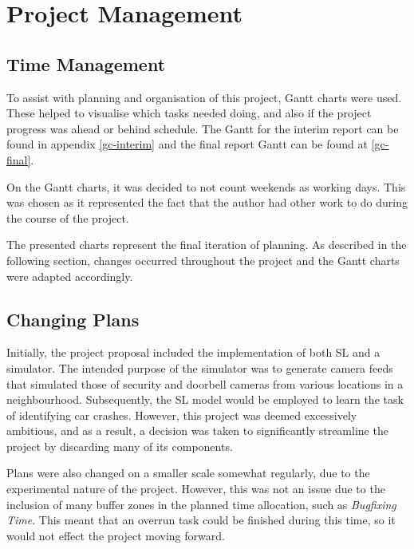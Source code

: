 \chapter{Project Management}
\section{Time Management}
To assist with planning and organisation of this project, Gantt charts were used. These helped to visualise which tasks needed doing, and also if the project progress was ahead or behind schedule. The Gantt for the interim report can be found in appendix \ref{gc-interim} and the final report Gantt can be found at \ref{gc-final}.

On the Gantt charts, it was decided to not count weekends as working days. This was chosen as it represented the fact that the author had other work to do during the course of the project.

The presented charts represent the final iteration of planning. As described in the following section, changes occurred throughout the project and the Gantt charts were adapted accordingly.

\section{Changing Plans}
Initially, the project proposal included the implementation of both SL and a simulator. The intended purpose of the simulator was to generate camera feeds that simulated those of security and doorbell cameras from various locations in a neighbourhood. Subsequently, the SL model would be employed to learn the task of identifying car crashes. However, this project was deemed excessively ambitious, and as a result, a decision was taken to significantly streamline the project by discarding many of its components.

Plans were also changed on a smaller scale somewhat regularly, due to the experimental nature of the project. However, this was not an issue due to the inclusion of many buffer zones in the planned time allocation, such as \emph{Bugfixing Time}. This meant that an overrun task could be finished during this time, so it would not effect the project moving forward.


